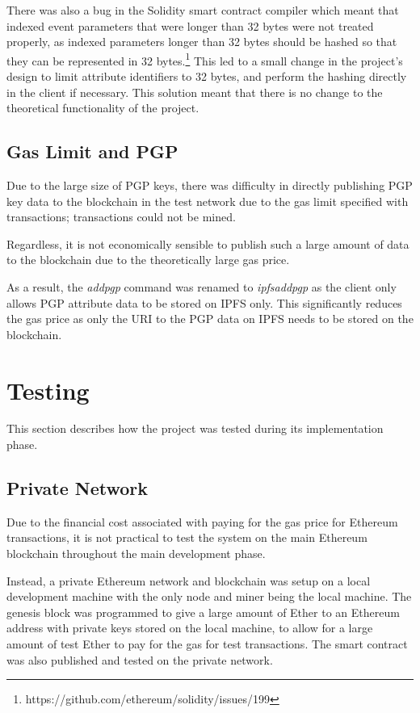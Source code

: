\documentclass[12pt,a4paper]{report}
\begin{document}
	There was also a bug in the Solidity smart contract compiler which meant that indexed event parameters that were longer than 32 bytes were not treated properly, as indexed parameters longer than 32 bytes should be hashed so that they can be represented in 32 bytes.\footnote{https://github.com/ethereum/solidity/issues/199} This led to a small change in the project's design to limit attribute identifiers to 32 bytes, and perform the hashing directly in the client if necessary. This solution meant that there is no change to the theoretical functionality of the project.
	
	\subsection{Gas Limit and PGP}
	Due to the large size of PGP keys, there was difficulty in directly publishing PGP key data to the blockchain in the test network due to the gas limit specified with transactions; transactions could not be mined.
	
	Regardless, it is not economically sensible to publish such a large amount of data to the blockchain due to the theoretically large gas price.
	
	As a result, the \textit{addpgp} command was renamed to \textit{ipfsaddpgp} as the client only allows PGP attribute data to be stored on IPFS only. This significantly reduces the gas price as only the URI to the PGP data on IPFS needs to be stored on the blockchain.
	
	\section{Testing}
	This section	 describes how the project was tested during its implementation phase.
	
	\subsection{Private Network}
	Due to the financial cost associated with paying for the gas price for Ethereum transactions, it is not practical to test the system on the main Ethereum blockchain throughout the main development phase.
	
	Instead, a private Ethereum network and blockchain was setup on a local development machine with the only node and miner being the local machine. The genesis block was programmed to give a large amount of Ether to an Ethereum address with private keys stored on the local machine, to allow for a large amount of test Ether to pay for the gas for test transactions. The smart contract was also published and tested on the private network.
	
\end{document}
